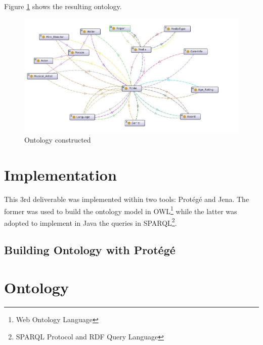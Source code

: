 \documentclass[a4paper,10pt]{article}
\begin{document}
Figure \ref{fig:onto} shows the resulting ontology.

\begin{figure}[h!]
 \centering
  \includegraphics[width=\textwidth]{movie_ontology.jpg}
 \caption{Ontology constructed}
 \label{fig:onto}
\end{figure}



\section{Implementation}

This 3rd deliverable was implemented within two tools: Protégé\cite{protege} and Jena\cite{jena}. The former was used to build the ontology model in OWL\footnote{Web Ontology Language} while the latter was adopted to implement in Java the queries in SPARQL\footnote{SPARQL Protocol and RDF Query Language}.

\subsection{Building Ontology with Protégé}





\appendix

\section{Ontology}





\end{document}
